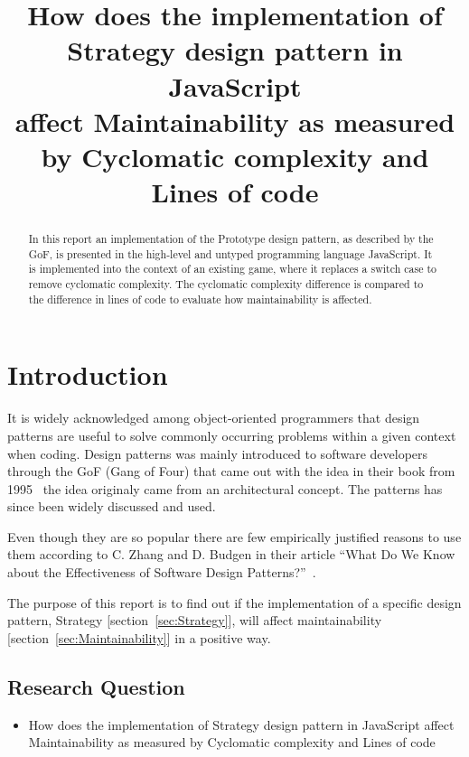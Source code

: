 \documentclass[conference, a4paper]{IEEEtran}
\begin{document}
\title{How does the implementation of\\
Strategy design pattern in JavaScript\\
affect Maintainability as measured by Cyclomatic complexity and Lines of code}
\author{
}

\maketitle

\begin{abstract}
	 In this report an implementation of the Prototype design pattern, as described by the GoF, is presented in the high-level and untyped programming language JavaScript. It is implemented into the context of an existing game, where it replaces a switch case to remove cyclomatic complexity. The cyclomatic complexity difference is compared to the difference in lines of code to evaluate how maintainability is affected.
\end{abstract}

\section{Introduction}
\label{sec:Introduction}
It is widely acknowledged among object-oriented programmers that design patterns are useful to solve commonly occurring problems within a given context when coding. Design patterns was mainly introduced to software developers through the GoF (Gang of Four) that came out with the idea in their book from 1995~\cite{bibitem:GoF} the idea originaly came from an architectural concept. The patterns has since been widely discussed and used.

Even though they are so popular there are few empirically justified reasons to use them according to C. Zhang and D. Budgen in their article ``What Do We Know about the Effectiveness of Software Design Patterns?''~\cite{bibitem:Zhang}.

The purpose of this report is to find out if the implementation of a specific design pattern, Strategy [section~\ref{sec:Strategy}], will affect maintainability [section~\ref{sec:Maintainability}] in a positive way.

\subsection{Research Question}
\begin{itemize}
	\item How does the implementation of Strategy design pattern in JavaScript affect Maintainability as measured by Cyclomatic complexity and Lines of code
\end{itemize}
\end{document}
